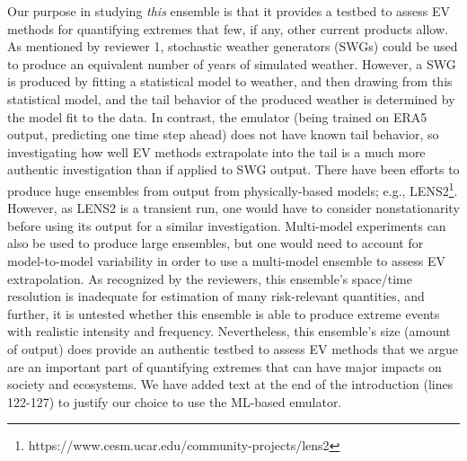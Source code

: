 \documentclass[12pt,english]{reviewresponse}
\begin{document}
\begin{revresponse}
Our purpose in studying {\em this} ensemble is that it provides a testbed to assess EV methods for quantifying extremes that few, if any, other current products allow.
As mentioned by reviewer 1, stochastic weather generators (SWGs) could be used to produce an equivalent number of years of simulated weather.
However, a SWG is produced by fitting a statistical model to weather, and then drawing from this statistical model, and the tail behavior of the produced weather is determined by the model fit to the data.
In contrast, the emulator (being trained on ERA5 output, predicting one time step ahead) does not have known tail behavior, so investigating how well EV methods extrapolate into the tail is a much more authentic investigation than if applied to SWG output.
There have been efforts to produce huge ensembles from output from physically-based models; e.g., LENS2\footnote{https://www.cesm.ucar.edu/community-projects/lens2}.
However, as LENS2 is a transient run, one would have to consider nonstationarity before using its output for a similar investigation.
Multi-model experiments can also be used to produce large ensembles, but one would need to account for model-to-model variability in order to use a multi-model ensemble to assess EV extrapolation.
As recognized by the reviewers, this ensemble's space/time resolution is inadequate for estimation of many risk-relevant quantities, and further, it is untested whether this ensemble is able to produce extreme events with realistic intensity and frequency.
Nevertheless, this ensemble's size (amount of output) does provide an authentic testbed to assess EV methods that we argue are an important part of quantifying extremes that can have major impacts on society and ecosystems. We have added text at the end of the introduction (lines 122-127) to justify our choice to use the ML-based emulator.



\end{revresponse}
\end{document}

